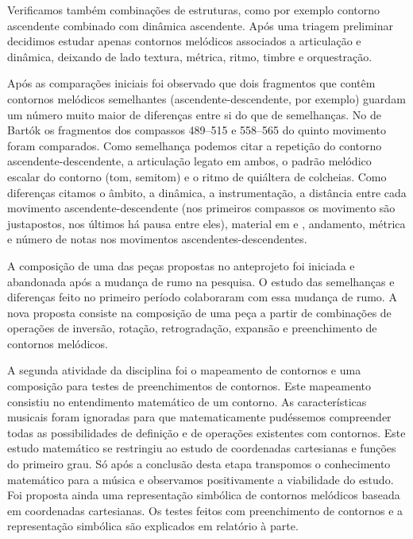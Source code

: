 \documentclass[12pt]{article}
\begin{document}
Verificamos também combinações de estruturas, como por exemplo
contorno ascendente combinado com dinâmica ascendente. Após uma
triagem preliminar decidimos estudar apenas contornos melódicos
associados a articulação e dinâmica, deixando de lado textura,
métrica, ritmo, timbre e orquestração.

Após as comparações iniciais foi observado que dois fragmentos que
contêm contornos melódicos semelhantes (ascendente-descendente, por
exemplo) guardam um número muito maior de diferenças entre si do que
de semelhanças. No  de Bartók os
fragmentos dos compassos 489--515 e 558--565 do quinto movimento foram
comparados. Como semelhança podemos citar a repetição do contorno
ascendente-descendente, a articulação legato em ambos, o padrão
melódico escalar do contorno (tom, semitom) e o ritmo de quiáltera de
colcheias. Como diferenças citamos o âmbito, a dinâmica, a
instrumentação, a distância entre cada movimento
ascendente-descendente (nos primeiros compassos os movimento são
justapostos, nos últimos há pausa entre eles), material em
 e , andamento, métrica e número de
notas nos movimentos ascendentes-descendentes.

A composição de uma das peças propostas no anteprojeto foi iniciada e
abandonada após a mudança de rumo na pesquisa. O estudo das
semelhanças e diferenças feito no primeiro período colaboraram com
essa mudança de rumo. A nova proposta consiste na composição de uma
peça a partir de combinações de operações de inversão, rotação,
retrogradação, expansão e preenchimento de contornos melódicos.

A segunda atividade da disciplina foi o mapeamento de contornos e uma
composição para testes de preenchimentos de contornos. Este mapeamento
consistiu no entendimento matemático de um contorno. As
características musicais foram ignoradas para que matematicamente
pudéssemos compreender todas as possibilidades de definição e de
operações existentes com contornos. Este estudo matemático se
restringiu ao estudo de coordenadas cartesianas e funções do primeiro
grau. Só após a conclusão desta etapa transpomos o conhecimento
matemático para a música e observamos positivamente a viabilidade do
estudo. Foi proposta ainda uma representação simbólica de contornos
melódicos baseada em coordenadas cartesianas. Os testes feitos com
preenchimento de contornos e a representação simbólica são explicados
em relatório à parte.
\end{document}
